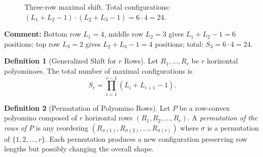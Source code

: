 \documentclass{article}
\theoremstyle{definition}
\newtheorem{definition}{Definition}[section]
\theoremstyle{plain}
\begin{document}
\begin{figure}[H]
\centering
{}
\caption{Three-row maximal shift. Total configurations: 
$(L_1+L_2-1)\cdot(L_2+L_3-1)=6\cdot4=24$.}
\label{fig:three_row_shift_precise}
\end{figure}

\noindent
\textbf{Comment:} Bottom row $L_1=4$, middle row $L_2=3$ gives 
$L_1+L_2-1=6$ positions; top row $L_3=2$ gives $L_2+L_3-1=4$ positions; 
total: $S_3 = 6\cdot 4 = 24$.

\begin{definition}[Generalized Shift for $r$ Rows]
Let $R_1,\dots,R_r$ be $r$ horizontal polyominoes. The total number of 
maximal configurations is
\[
S_r = \prod_{i=1}^{r-1} (L_i + L_{i+1}-1).
\]
\end{definition}

\begin{definition}[Permutation of Polyomino Rows]
Let $P$ be a row-convex polyomino composed of $r$ horizontal rows 
$(R_1, R_2, \dots, R_r)$. A \emph{permutation of the rows of $P$} is any 
reordering $(R_{\sigma(1)}, R_{\sigma(2)}, \dots, R_{\sigma(r)})$ where 
$\sigma$ is a permutation of $\{1,2,\dots,r\}$. Each permutation produces 
a new configuration preserving row lengths but possibly changing the 
overall shape.
\end{definition}
\end{document}
